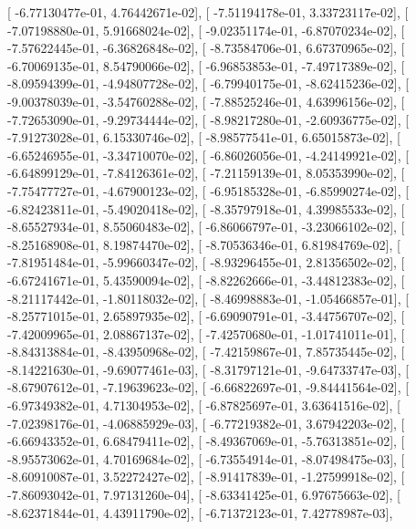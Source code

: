 \documentclass{article}
\begin{document}
       [ -6.77130477e-01,   4.76442671e-02],
       [ -7.51194178e-01,   3.33723117e-02],
       [ -7.07198880e-01,   5.91668024e-02],
       [ -9.02351174e-01,  -6.87070234e-02],
       [ -7.57622445e-01,  -6.36826848e-02],
       [ -8.73584706e-01,   6.67370965e-02],
       [ -6.70069135e-01,   8.54790066e-02],
       [ -6.96853853e-01,  -7.49717389e-02],
       [ -8.09594399e-01,  -4.94807728e-02],
       [ -6.79940175e-01,  -8.62415236e-02],
       [ -9.00378039e-01,  -3.54760288e-02],
       [ -7.88525246e-01,   4.63996156e-02],
       [ -7.72653090e-01,  -9.29734444e-02],
       [ -8.98217280e-01,  -2.60936775e-02],
       [ -7.91273028e-01,   6.15330746e-02],
       [ -8.98577541e-01,   6.65015873e-02],
       [ -6.65246955e-01,  -3.34710070e-02],
       [ -6.86026056e-01,  -4.24149921e-02],
       [ -6.64899129e-01,  -7.84126361e-02],
       [ -7.21159139e-01,   8.05353990e-02],
       [ -7.75477727e-01,  -4.67900123e-02],
       [ -6.95185328e-01,  -6.85990274e-02],
       [ -6.82423811e-01,  -5.49020418e-02],
       [ -8.35797918e-01,   4.39985533e-02],
       [ -8.65527934e-01,   8.55060483e-02],
       [ -6.86066797e-01,  -3.23066102e-02],
       [ -8.25168908e-01,   8.19874470e-02],
       [ -8.70536346e-01,   6.81984769e-02],
       [ -7.81951484e-01,  -5.99660347e-02],
       [ -8.93296455e-01,   2.81356502e-02],
       [ -6.67241671e-01,   5.43590094e-02],
       [ -8.82262666e-01,  -3.44812383e-02],
       [ -8.21117442e-01,  -1.80118032e-02],
       [ -8.46998883e-01,  -1.05466857e-01],
       [ -8.25771015e-01,   2.65897935e-02],
       [ -6.69090791e-01,  -3.44756707e-02],
       [ -7.42009965e-01,   2.08867137e-02],
       [ -7.42570680e-01,  -1.01741011e-01],
       [ -8.84313884e-01,  -8.43950968e-02],
       [ -7.42159867e-01,   7.85735445e-02],
       [ -8.14221630e-01,  -9.69077461e-03],
       [ -8.31797121e-01,  -9.64733747e-03],
       [ -8.67907612e-01,  -7.19639623e-02],
       [ -6.66822697e-01,  -9.84441564e-02],
       [ -6.97349382e-01,   4.71304953e-02],
       [ -6.87825697e-01,   3.63641516e-02],
       [ -7.02398176e-01,  -4.06885929e-03],
       [ -6.77219382e-01,   3.67942203e-02],
       [ -6.66943352e-01,   6.68479411e-02],
       [ -8.49367069e-01,  -5.76313851e-02],
       [ -8.95573062e-01,   4.70169684e-02],
       [ -6.73554914e-01,  -8.07498475e-03],
       [ -8.60910087e-01,   3.52272427e-02],
       [ -8.91417839e-01,  -1.27599918e-02],
       [ -7.86093042e-01,   7.97131260e-04],
       [ -8.63341425e-01,   6.97675663e-02],
       [ -8.62371844e-01,   4.43911790e-02],
       [ -6.71372123e-01,   7.42778987e-03],
\end{document}
